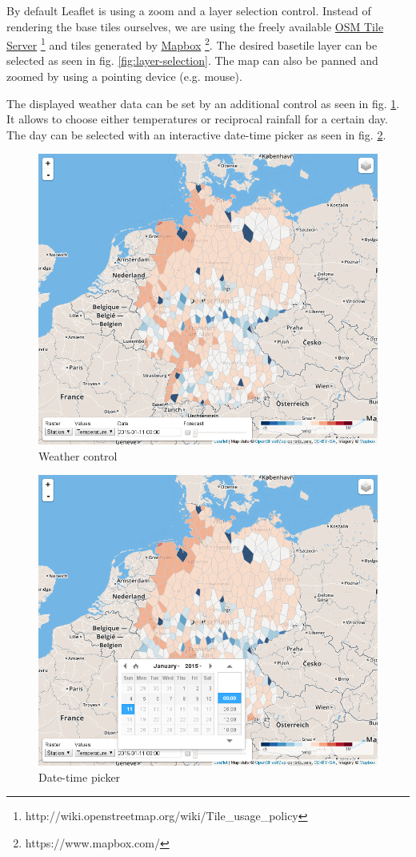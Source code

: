 \documentclass[paper=a4, fontsize=11pt]{article} %
\numberwithin{equation}{section} %
\numberwithin{figure}{section} %
\numberwithin{table}{section} %
\begin{document}
By default Leaflet is using a zoom and a layer selection control.
Instead of rendering the base tiles ourselves, we are using the freely
available \href{http://wiki.openstreetmap.org/wiki/Tile_usage_policy}{OSM Tile Server} \footnote{http://wiki.openstreetmap.org/wiki/Tile\_usage\_policy} and tiles generated by
\href{https://www.mapbox.com/}{Mapbox} \footnote{https://www.mapbox.com/}. The desired basetile layer can be selected as seen in fig. \ref{fig:layer-selection}.
The map can also be panned and zoomed by using a pointing device
(e.g. mouse).

The displayed weather data can be set by an additional control as seen
in fig. \ref{fig:weather-control}.
It allows to choose either temperatures or reciprocal rainfall for a
certain day. The day can be selected with an interactive date-time picker
as seen in fig. \ref{fig:date-time-picker}.

\begin{figure}[htbp]
\centering
\includegraphics[width=.8\textwidth]{pictures/screenshot-control.png}
\caption{Weather control}
\label{fig:weather-control}
\end{figure}

\begin{figure}[htbp]
\centering
\includegraphics[width=.8\textwidth]{pictures/screenshot-control-datetime.png}
\caption{Date-time picker}
\label{fig:date-time-picker}
\end{figure}
\end{document}
